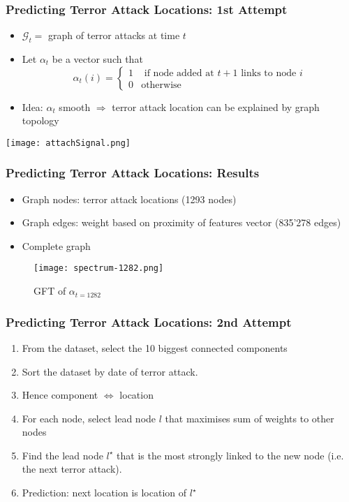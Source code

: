 \begin{frame}
\frametitle{Predicting Terror Attack Locations: 1st Attempt}

\begin{itemize}

\item $\mathcal{G}_t = $ graph of terror attacks at time $t$

\item Let $\alpha_t$ be a vector such that
\begin{equation}
\alpha_t(i)= \begin{cases}
1 		& \text{ if node added at } t+1 \text{ links to node }i \\
0		& \text{otherwise}
\end{cases}
\end{equation}

\item Idea: $\alpha_t$ smooth $\Rightarrow$ terror attack location can be explained by graph topology 

\end{itemize}
\begin{center}
\texttt{[image: attachSignal.png]}
\end{center}
\end{frame}

\begin{frame}
\frametitle{Predicting Terror Attack Locations: Results}

\begin{itemize}
\item Graph nodes: terror attack locations (1293 nodes)
\item Graph edges: weight based on proximity of features vector (835'278 edges)
\item Complete graph
\end{itemize}
\begin{figure}[H]
\begin{center}
\texttt{[image: spectrum-1282.png]}
\caption{GFT of $\alpha_{t=1282}$}
\label{fig:spectrum-1282}
\end{center}
\end{figure}

\end{frame}

\begin{frame}
\frametitle{Predicting Terror Attack Locations: 2nd Attempt}
\begin{enumerate}
\item From the dataset, select the 10 biggest connected components
\item Sort the dataset by date of terror attack.
\item Hence component $\Leftrightarrow$ location
\item For each node, select lead node $l$ that maximises sum of weights to other nodes
\item Find the lead node $l^\star$ that is the most strongly linked to the new node (i.e. the next terror attack).
\item Prediction: next location is location of $l^\star$
\end{enumerate}
\end{frame}

